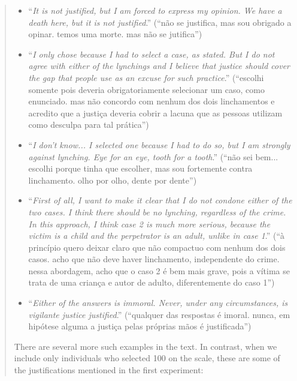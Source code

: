 \documentclass[a4paper,12pt]{article}
\begin{document}
\begin{quote}
\begin{itemize}
  \item ``\textit{It is not justified, but I am forced to express my opinion. We have a death here, but it is not justified}.'' (``não se justifica, mas sou obrigado a opinar. temos uma morte. mas não se jutifica'') 
  \item ``\textit{I only chose because I had to select a case, as stated. But I do not agree with either of the lynchings and I believe that justice should cover the gap that people use as an excuse for such practice}.'' (``escolhi somente pois deveria obrigatoriamente selecionar um caso, como enunciado. mas não concordo com nenhum dos dois linchamentos e acredito que a justiça deveria cobrir a lacuna que as pessoas utilizam como desculpa para tal prática'')
  \item ``\textit{I don't know... I selected one because I had to do so, but I am strongly against lynching. Eye for an eye, tooth for a tooth}.'' (``não sei bem... escolhi porque tinha que escolher, mas sou fortemente contra linchamento. olho por olho, dente por dente'')
  \item ``\textit{First of all, I want to make it clear that I do not condone either of the two cases. I think there should be no lynching, regardless of the crime. In this approach, I think case 2 is much more serious, because the victim is a child and the perpetrator is an adult, unlike in case 1}.'' (``à princípio quero deixar claro que não compactuo com nenhum dos dois casos. acho que não deve haver linchamento, independente do crime. nessa abordagem, acho que o caso 2 é bem mais grave, pois a vítima se trata de uma criança e autor de adulto, diferentemente do caso 1'')
  \item ``\textit{Either of the answers is immoral. Never, under any circumstances, is vigilante justice justified}.'' (``qualquer das respostas é imoral. nunca, em hipótese alguma a justiça pelas próprias mãos é justificada'')

\end{itemize}

There are several more such examples in the text. In contrast, when we include
only individuals who selected 100 on the scale, these are some of the
justifications mentioned in the first experiment:


\end{quote}
\end{document}
